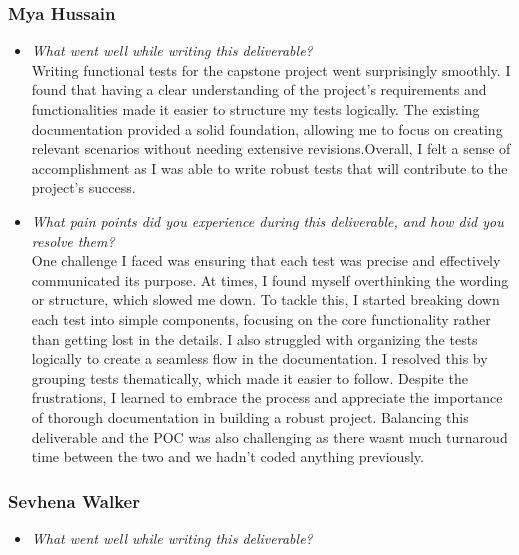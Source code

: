 \documentclass[12pt, titlepage]{article}
\begin{document}
\begin{appendices}
    \subsubsection*{Mya Hussain}
    \begin{itemize}
      \item \textit{What went well while writing this deliverable?} \\

        Writing functional tests for the capstone project went surprisingly
        smoothly. I found that having a clear understanding of the project's
        requirements and functionalities made it easier to structure my tests
        logically. The existing documentation provided a solid foundation,
        allowing me to focus on creating relevant scenarios without needing
        extensive revisions.Overall, I felt a sense of accomplishment
        as I was able to
        write robust tests that will contribute to the project's
        success.

      \item \textit{What pain points did you experience during this
        deliverable, and how did you resolve them?}\\

        One challenge I faced was ensuring that each test was precise and
        effectively communicated its purpose. At times, I found myself
        overthinking the wording or structure, which slowed me down. To
        tackle this, I started breaking down each test into simple components,
        focusing on the core functionality rather than getting lost in the
        details. I also struggled with organizing the tests logically to
        create a seamless flow in the documentation. I resolved this by
        grouping tests thematically, which made it easier to follow. Despite
        the frustrations, I learned to embrace the process and appreciate the
        importance of thorough documentation in building a robust project.
        Balancing this deliverable and the POC was also challenging as there
        wasnt much turnaroud time between the two and we hadn't coded anything
        previously.

    \end{itemize}

    \subsubsection*{Sevhena Walker}
    \begin{itemize}
      \item \textit{What went well while writing this deliverable?} \\


\end{itemize}
\end{appendices}
\end{document}
